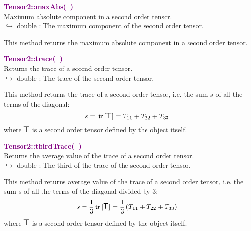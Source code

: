 \textcolor{purple}{\textbf{Tensor2::maxAbs(~)}}\label{Tensor2::maxAbs()}\\
Maximum absolute component in a second order tensor.\\ \hspace*{10mm}$\hookrightarrow$ double : The maximum component of the second order tensor.

This method returns the maximum absolute component in a second order tensor.

\textcolor{purple}{\textbf{Tensor2::trace(~)}}\label{Tensor2::trace()}\\
Returns the trace of a second order tensor.\\ \hspace*{10mm}$\hookrightarrow$ double : The trace of the second order tensor.

This method returns the trace of a second order tensor, i.e. the sum $s$ of all the terms of the diagonal:
\begin{equation*}
s = \mbox{\ensuremath{\mathsf{\,tr\,}}}[\mbox{\large\ensuremath{\mathsf{T}}}] = T_{11}+T_{22}+T_{33}
\end{equation*}
where $\mbox{\large\ensuremath{\mathsf{T}}}$ is a second order tensor defined by the object itself.

\textcolor{purple}{\textbf{Tensor2::thirdTrace(~)}}\label{Tensor2::thirdTrace()}\\
Returns the average value of the trace of a second order tensor.\\ \hspace*{10mm}$\hookrightarrow$ double : The third of the trace of the second order tensor.

This method returns average value of the trace of a second order tensor, i.e. the sum $s$ of all the terms of the diagonal divided by 3:
\begin{equation*}
s = \frac{1}{3} \mbox{\ensuremath{\mathsf{\,tr\,}}}[\mbox{\large\ensuremath{\mathsf{T}}}] =  \frac{1}{3} \left( T_{11}+T_{22}+T_{33} \right)
\end{equation*}
where $\mbox{\large\ensuremath{\mathsf{T}}}$ is a second order tensor defined by the object itself.

